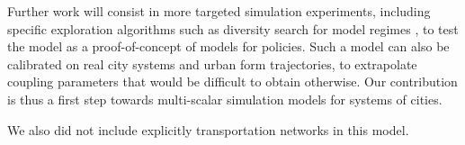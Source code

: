 \documentclass[11pt]{article}
\begin{document}
Further work will consist in more targeted simulation experiments, including specific exploration algorithms such as diversity search for model regimes \cite{reuillon2013openmole}, to test the model as a proof-of-concept of models for policies. Such a model can also be calibrated on real city systems and urban form trajectories, to extrapolate coupling parameters that would be difficult to obtain otherwise. Our contribution is thus a first step towards multi-scalar simulation models for systems of cities.

We also did not include explicitly transportation networks in this model.






\end{document}

